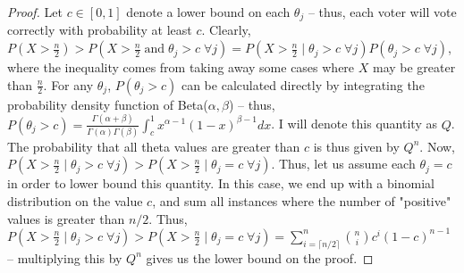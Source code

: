 \begin{proof}
Let $c \in [0,1]$ denote a lower bound on each $\theta_j$ -- thus, each voter will vote correctly with probability at least $c$. Clearly, $P(X > \frac{n}{2}) > P(X > \frac{n}{2} \; \text{and} \; \theta_j > c \; \forall j) = P(X > \frac{n}{2} \mid \theta_j > c \; \forall j)P(\theta_j > c \; \forall j)$, where the inequality comes from taking away some cases where $X$ may be greater than $\frac{n}{2}$. For any $\theta_j$, $P(\theta_j > c)$ can be calculated directly by integrating the probability density function of Beta($\alpha, \beta$) -- thus, $P(\theta_j > c) = \frac{\Gamma(\alpha + \beta)}{\Gamma(\alpha)\Gamma(\beta)}\int_{c}^{1} x^{\alpha - 1}(1-x)^{\beta-1}dx$. I will denote this quantity as $Q$. The probability that all theta values are greater than $c$ is thus given by $Q^n$. Now, $P(X > \frac{n}{2} \mid \theta_j > c \; \forall j) > P(X > \frac{n}{2} \mid \theta_j = c \; \forall j)$. Thus, let us assume each $\theta_j = c$ in order to lower bound this quantity. In this case, we end up with a binomial distribution on the value $c$, and sum all instances where the number of "positive" values is greater than $n/2$. Thus, $P(X > \frac{n}{2} \mid \theta_j > c \; \forall j) > P(X > \frac{n}{2} \mid \theta_j = c \; \forall j) = \sum_{i=\lceil n/2 \rceil}^{n} {n \choose i} c^i (1-c)^{n-1}$ -- multiplying this by $Q^n$ gives us the lower bound on the proof.
\end{proof}


\begin{comment}

How were these distributions chosen?

For the costs, I wanted a continuous distribution that only allowed positive values, as any algorithm must run for at least some amount of time. Furthermore, since we are unable to determine whether an algorithm will terminate for a given input	\cite(haltingProblem), I wanted a distribution that would allow for an algorithm to run for an infinite amount of time. Thus, whatever distribution I chose needed to output costs in the interval $(0, \infty)$. I also wanted a modal distribution to support the idea that there might be a concentration of voting functions with similar runtimes. Finally, I wanted a distribution whose shape was not dependent on scale -- this was motivated by the fact that the time an algorithm takes to run should be invariant to which unit of time we use -- thus, we do not want the shape of our distribution to change if we are talking about seconds or milliseconds. In this case, we want to be able to multiply all values of the distribution by a constant, which the general gamma distribution supports.

For voter correctness, I wanted to adapt the model of voters being distributed i.i.d bernoulli to one in which voters did not have identical bernoulli distributions. Thus, I wanted some distribution from which I could draw an input to a bernoulli -- that is, a distribution on the interval $[0,1]$.

\end{comment}



